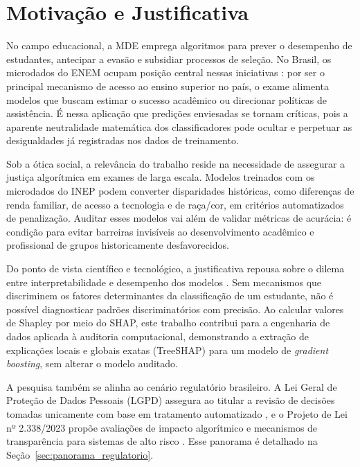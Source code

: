 \section{Motivação e Justificativa}
No campo educacional, a MDE emprega algoritmos para prever o desempenho de estudantes, antecipar a evasão e subsidiar processos de seleção. No Brasil, os microdados do ENEM \cite{inep2022microdados} ocupam posição central nessas iniciativas \cite{luz2025uso, souza2025desigualdades}: por ser o principal mecanismo de acesso ao ensino superior no país, o exame alimenta modelos que buscam estimar o sucesso acadêmico ou direcionar políticas de assistência. É nessa aplicação que predições enviesadas se tornam críticas, pois a aparente neutralidade matemática dos classificadores pode ocultar e perpetuar as desigualdades já registradas nos dados de treinamento.

Sob a ótica social, a relevância do trabalho reside na necessidade de assegurar a justiça algorítmica em exames de larga escala. Modelos treinados com os microdados do INEP podem converter disparidades históricas, como diferenças de renda familiar, de acesso a tecnologia e de raça/cor, em critérios automatizados de penalização. Auditar esses modelos vai além de validar métricas de acurácia: é condição para evitar barreiras invisíveis ao desenvolvimento acadêmico e profissional de grupos historicamente desfavorecidos.

Do ponto de vista científico e tecnológico, a justificativa repousa sobre o dilema entre interpretabilidade e desempenho dos modelos \cite{rudin2019stop}. Sem mecanismos que discriminem os fatores determinantes da classificação de um estudante, não é possível diagnosticar padrões discriminatórios com precisão. Ao calcular valores de Shapley por meio do SHAP, este trabalho contribui para a engenharia de dados aplicada à auditoria computacional, demonstrando a extração de explicações locais e globais exatas (TreeSHAP) para um modelo de \textit{gradient boosting}, sem alterar o modelo auditado.

A pesquisa também se alinha ao cenário regulatório brasileiro. A Lei Geral de Proteção de Dados Pessoais (LGPD) assegura ao titular a revisão de decisões tomadas unicamente com base em tratamento automatizado \cite{brasil2018lgpd}, e o Projeto de Lei nº 2.338/2023 propõe avaliações de impacto algorítmico e mecanismos de transparência para sistemas de alto risco \cite{brasil2023pl2338}. Esse panorama é detalhado na Seção~\ref{sec:panorama_regulatorio}.

